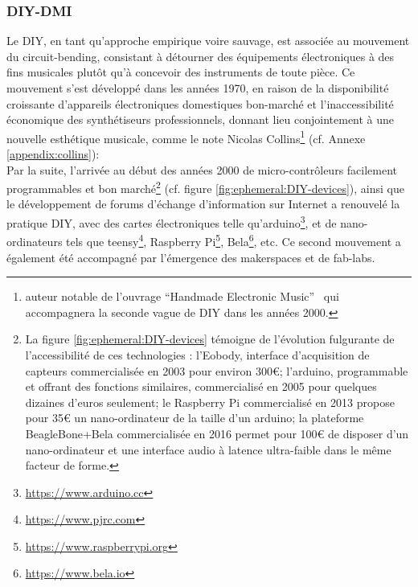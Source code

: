 \subsubsection{DIY-DMI}

\noindent Le \gls{DIY}, en tant qu'approche empirique voire sauvage, est associée au mouvement du \gls{circuit-bending}, consistant à détourner des équipements électroniques à des fins musicales plutôt qu'à concevoir des instruments de toute pièce. Ce mouvement s'est développé dans les années 1970, en raison de la disponibilité croissante d'appareils électroniques domestiques bon-marché et l'inaccessibilité économique des synthétiseurs professionnels, donnant lieu conjointement à une nouvelle esthétique musicale, comme le note Nicolas Collins\footnote{auteur notable de l'ouvrage ``Handmade Electronic Music''~\cite{collins_handmade_2006} qui accompagnera la seconde vague de \gls{DIY} dans les années 2000.} (cf. Annexe \ref{appendix:collins}): \\
\indent Par la suite, l'arrivée au début des années 2000 de micro-contrôleurs facilement programmables et bon marché\footnote{La figure \ref{fig:ephemeral:DIY-devices} témoigne de l'évolution fulgurante de l'accessibilité de ces technologies : l'Eobody, interface d'acquisition de capteurs commercialisée en 2003 pour environ 300€; l'arduino, programmable et offrant des fonctions similaires, commercialisé en 2005 pour quelques dizaines d'euros seulement; le Raspberry Pi commercialisé en 2013 propose pour 35€ un nano-ordinateur de la taille d'un arduino; la plateforme BeagleBone+Bela commercialisée en 2016 permet pour 100€ de disposer d'un nano-ordinateur et une interface audio à latence ultra-faible dans le même facteur de forme.} (cf. figure \ref{fig:ephemeral:DIY-devices}), ainsi que le développement de forums d'échange d'information sur Internet a renouvelé la pratique \gls{DIY}, avec des cartes électroniques telle qu'arduino\footnote{\url{https://www.arduino.cc}}, et de nano-ordinateurs tels que teensy\footnote{\url{https://www.pjrc.com}}, Raspberry Pi\footnote{\url{https://www.raspberrypi.org}}, Bela\footnote{\url{https://www.bela.io}}, etc. Ce second mouvement a également été accompagné par l'émergence des \glspl{makerspace} et de \glspl{fab-lab}.
